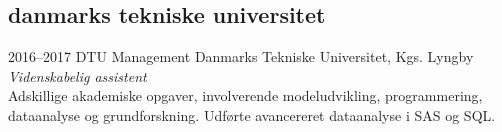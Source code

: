 \documentclass[]{../friggeri-cv} %
\begin{document}
\subsection{danmarks tekniske universitet}

\begin{entrylist}


\entry
{2016--2017}
{DTU Management}
{Danmarks Tekniske Universitet, Kgs. Lyngby}
{\emph{Videnskabelig assistent}\\
Adskillige akademiske opgaver, involverende modeludvikling, programmering, dataanalyse og grundforskning. Udførte avancereret dataanalyse i SAS og SQL.}

\end{entrylist}




\end{document}

